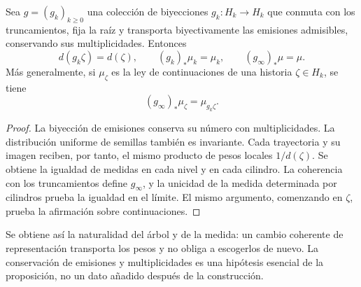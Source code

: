 \begin{proposition}
\label{prop:ch-naturalidad-medida}
Sea \(g=(g_k)_{k\geq0}\) una colección de biyecciones \(g_k:H_k\to H_k\)
que conmuta con los truncamientos, fija la raíz y transporta biyectivamente
las emisiones admisibles, conservando sus multiplicidades. Entonces
\[
 d(g_k\zeta)=d(\zeta),\qquad
 (g_k)_*\mu_k=\mu_k,\qquad (g_\infty)_*\mu=\mu.
\]
Más generalmente, si \(\mu_\zeta\) es la ley de continuaciones de una
historia \(\zeta\in H_k\), se tiene
\[
 (g_\infty)_*\mu_\zeta=\mu_{g_k\zeta}.
\]
\end{proposition}

\begin{proof}
La biyección de emisiones conserva su número con multiplicidades. La
distribución uniforme de semillas también es invariante. Cada trayectoria
y su imagen reciben, por tanto, el mismo producto de pesos locales
\(1/d(\zeta)\). Se obtiene la igualdad de medidas en cada nivel y en
cada cilindro. La coherencia con los truncamientos define \(g_\infty\),
y la unicidad de la medida determinada por cilindros prueba la igualdad
en el límite. El mismo argumento, comenzando en \(\zeta\), prueba la
afirmación sobre continuaciones.
\end{proof}

Se obtiene así la naturalidad del árbol y de la medida: un cambio coherente
de representación transporta los pesos y no obliga a escogerlos de nuevo.
La conservación de emisiones y multiplicidades es una hipótesis esencial de
la proposición, no un dato añadido después de la construcción.
